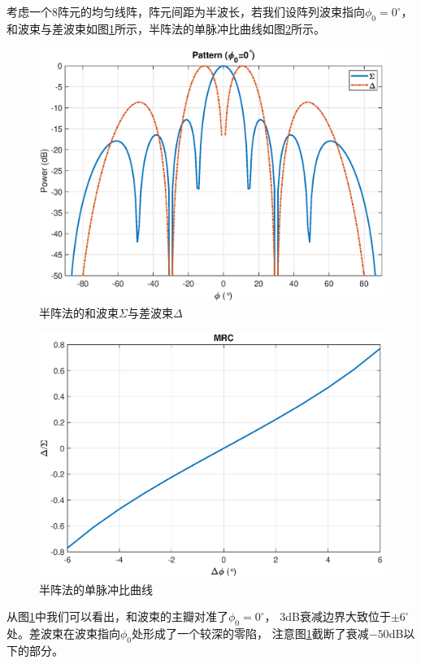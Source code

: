 \documentclass[master]{thesis-uestc}
\begin{document}
考虑一个$8$阵元的均匀线阵，阵元间距为半波长，若我们设阵列波束指向$\phi_0=0^\circ$，
和波束与差波束如图\ref{semi_sigma_delta}所示，半阵法的单脉冲比曲线如图\ref{semi_MRC_figure}所示。
\begin{figure}[h]
\includegraphics[scale=0.4]{pic/semi_sigma_delta.eps}
\caption{半阵法的和波束$\Sigma$与差波束$\Delta$}
\label{semi_sigma_delta}
\end{figure}

\begin{figure}[h]
\includegraphics[scale=0.4]{pic/semi_MRC.eps}
\caption{半阵法的单脉冲比曲线}
\label{semi_MRC_figure}
\end{figure}

从图\ref{semi_sigma_delta}中我们可以看出，和波束的主瓣对准了$\phi_0=0^\circ$，
$3$dB衰减边界大致位于$\pm6^\circ$处。差波束在波束指向$\phi_0$处形成了一个较深的零陷，
注意图\ref{semi_sigma_delta}截断了衰减$-50$dB以下的部分。
\end{document}
